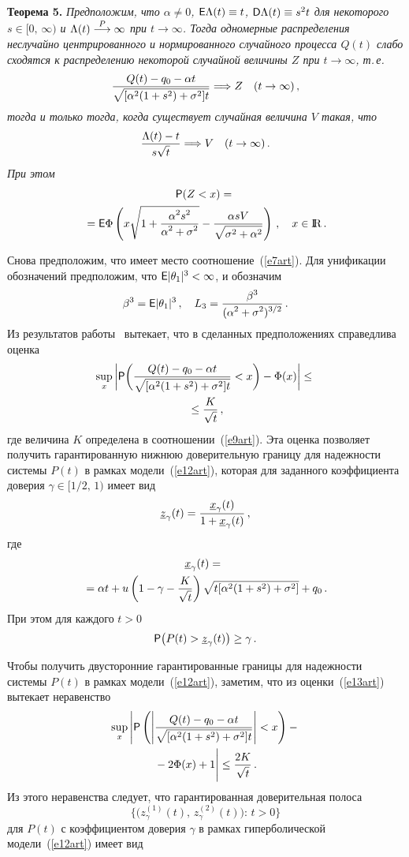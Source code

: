 \begin{multicols}{2}
\smallskip

\noindent
{\textbf{Теорема 5.}} {\it Предположим, что $\alpha\neq 0$, ${\sf
E}\Lambda(t) \equiv t$,  ${\sf D}\Lambda(t)\equiv s^2t$ для
некоторого $s\in[0,\,\infty)$ и $\Lambda(t)\stackrel{P}{\longrightarrow}\infty$ при $t\to\infty$.
Тогда одномерные распределения неслучайно центрированного и
нормированного случайного процесса $Q(t)$ слабо сходятся к
распределению некоторой случайной величины $Z$ при $t\to\infty$,
т.\,е.\
$$
\displaystyle\frac{\displaystyle Q(t)-q_0-\alpha
t\mathstrut}{\displaystyle \sqrt{[\alpha^2(1+s^2)+\sigma^2]t}\mathstrut}\Longrightarrow Z\ \ \
(t\to\infty)\,,
$$
тогда и только тогда, когда существует случайная величина $V$
такая, что
$$
\displaystyle\frac{\displaystyle \Lambda(t)-t\mathstrut}{\displaystyle s\sqrt t\mathstrut}\Longrightarrow V\ \ \ (t\to\infty)\,.
$$
При этом}
\begin{multline*}
{\sf P}(Z<x)={}\\
{}={\sf
E}\Phi\left(x\sqrt{1+\displaystyle\frac{\displaystyle \alpha^2s^2\mathstrut}{\displaystyle \alpha^2+\sigma^2\mathstrut}}-\displaystyle\frac{\displaystyle \alpha
sV\mathstrut}{\displaystyle \sqrt{\sigma^2+\alpha^2}\mathstrut}\right)\,,\ \ \ x\in{\rm I\hspace{-0.7mm}\rm R}\,.
\end{multline*}

\smallskip

Снова предположим, что имеет место соотношение~(\ref{e7art}). Для унификации
обозначений предположим, что ${\sf E}|\theta_1|^3<\infty$, и обозначим
$$
\beta^3 = {\sf E}|\theta_1|^3\,,\ \ \ L_3 =
\displaystyle\frac{\displaystyle \beta^3\mathstrut}{\displaystyle (\alpha^2+\sigma^2)^{3/2}\mathstrut}\,.
$$
Из результатов работы~\cite{10art} вытекает, что в сделанных
предположениях справедлива оценка
\begin{multline}
\sup_x\bigg|{\sf P}\bigg(\displaystyle\frac{\displaystyle Q(t)-q_0-\alpha
t\mathstrut}{\displaystyle \sqrt{[\alpha^2(1+s^2)+\sigma^2]t}\mathstrut}<x\bigg)-\Phi(x)\bigg|\le{}\\
{}\le
\displaystyle\frac{\displaystyle K\mathstrut}{\displaystyle \sqrt{t}\mathstrut}\,,
\label{e13art}
\end{multline}
где величина $K$ определена в соотношении~(\ref{e9art}). Эта оценка
позволяет получить гарантированную нижнюю доверительную границу
для надежности системы $P(t)$ в рамках модели~(\ref{e12art}), которая для
заданного коэффициента доверия $\gamma\in [1/2,\,1)$ имеет вид
$$
\underline z_{\gamma}(t)=\displaystyle\frac{\displaystyle \underline
x_{\gamma}(t)\mathstrut}{\displaystyle 1+\underline x_{\gamma}(t)\mathstrut}\,,
$$
где
\begin{multline*}
\!\underline x_{\gamma}(t)={}\\
{}=\alpha
t+u\left(1-\gamma-\displaystyle\frac{\displaystyle K\mathstrut}{\displaystyle \sqrt{t}\mathstrut}\right)\sqrt{t[\alpha^2(1+s^2)+\sigma^2]}+
q_0\,.
\end{multline*}
При этом для каждого $t>0$
$$
{\sf P}\big(P(t)>\underline z_{\gamma}(t)\big)\ge\gamma\,.
$$

Чтобы получить двусторонние гарантированные границы для надежности
системы $P(t)$ в рамках модели~(\ref{e12art}), заметим, что из оценки~(\ref{e13art})
вытекает неравенство
\begin{multline*}
\sup_x\Bigg|{\sf P}\left(\left|\displaystyle\frac{\displaystyle Q(t)-q_0-\alpha
t\mathstrut}{\displaystyle \sqrt{[\alpha^2(1+s^2)+\sigma^2]t}\mathstrut}\right|<x\right)-{}\\
{}-2\Phi(x)+1\Bigg|\le
\displaystyle\frac{\displaystyle 2K\mathstrut}{\displaystyle \sqrt{t}\mathstrut}\,.
\end{multline*}
Из этого неравенства следует, что гарантированная доверительная
полоса
$$
\big\{\big(z^{(1)}_{\gamma}(t),\,z^{(2)}_{\gamma}(t)\big):\,t>0\big\}
$$
для $P(t)$ с коэффициентом доверия $\gamma$ в рамках
гиперболической модели~(\ref{e12art}) имеет вид
\end{multicols}
